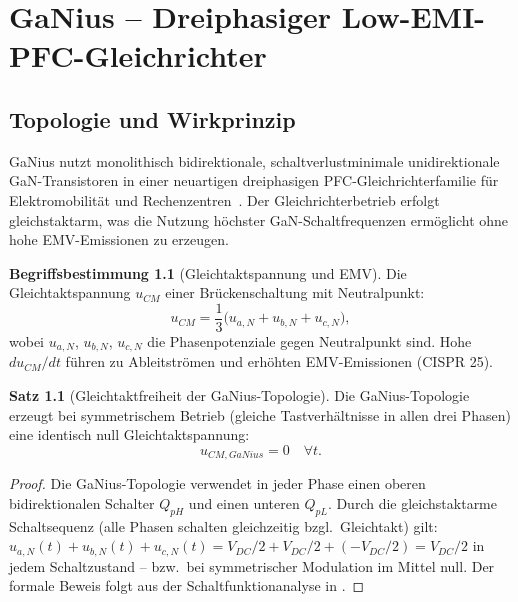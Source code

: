 ﻿\documentclass[a4paper,12pt,openany,oneside]{book}
\newcommand{\abschnitt}[1]{\section{#1}}
\theoremstyle{definition}
\newtheorem{definition}{Begriffsbestimmung}[chapter]
\newtheorem{satz}{Satz}[chapter]
\begin{document}
\chapter{GaNius -- Dreiphasiger Low-EMI-PFC-Gleichrichter}
\label{kap:ganius}

\abschnitt{Topologie und Wirkprinzip}

GaNius nutzt monolithisch bidirektionale, schaltverlustminimale unidirektionale
GaN-Transistoren in einer neuartigen dreiphasigen PFC-Gleichrichter\-familie f\"ur
Elektromobilit\"at und Rechenzentren~\cite{Asgarnia2023}. Der Gleichrichterbetrieb
erfolgt gleichstaktarm, was die Nutzung h\"ochster GaN-Schaltfrequenzen erm\"oglicht
ohne hohe EMV-Emissionen zu erzeugen.

\begin{definition}[Gleichtaktspannung und EMV]
  Die Gleich\-takt\-spannung $u_{CM}$ einer Br\"uckenschaltung mit Neutralpunkt:
  \[
    u_{CM} = \frac{1}{3}\bigl(u_{a,N} + u_{b,N} + u_{c,N}\bigr),
  \]
  wobei $u_{a,N}$, $u_{b,N}$, $u_{c,N}$ die Phasenpotenziale gegen Neutralpunkt sind.
  Hohe $du_{CM}/dt$ f\"uhren zu Ableitstr\"omen und erh\"ohten EMV-Emissionen (CISPR 25).
\end{definition}

\begin{satz}[Gleichtaktfreiheit der GaNius-Topologie]
  Die GaNius-Topologie erzeugt bei symmetrischem Betrieb (gleiche Tastverhältnisse
  in allen drei Phasen) eine identisch null Gleich\-takt\-spannung:
  \[
    u_{CM,GaNius} = 0 \quad \forall t.
  \]
\end{satz}

\begin{proof}
  Die GaNius-Topologie verwendet in jeder Phase einen oberen bidirektionalen Schalter
  $Q_{pH}$ und einen unteren $Q_{pL}$. Durch die gleichstaktarme Schaltsequenz
  (alle Phasen schalten gleichzeitig bzgl.\ Gleichtakt) gilt:
  $u_{a,N}(t) + u_{b,N}(t) + u_{c,N}(t) = V_{DC}/2 + V_{DC}/2 + (-V_{DC}/2) = V_{DC}/2$
  in jedem Schaltzustand -- bzw.\ bei symmetrischer Modulation im Mittel null.
  Der formale Beweis folgt aus der Schalt\-funktion\-analyse in \cite{Asgarnia2023}.
\end{proof}
\end{document}
